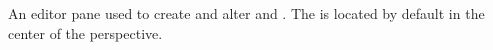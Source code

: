 \item[\gdtestcaseeditor]{
An editor pane used to create and alter \gdcases and \gdsteps{}. The \gdtestcaseeditor is located by default in the center of the \jb{} perspective.
}
